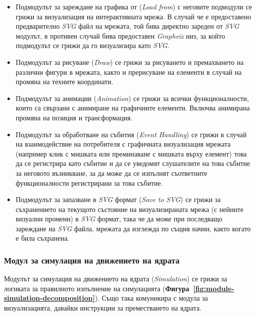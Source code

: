 \begin{itemize}
	\item Подмодулът за зареждане на графика от (\textit{Load from}) с неговите подмодули се грижи за визуализация на интерактивната мрежа. В случай че е предоставено предварително \textit{SVG} файл на мрежата, той бива директно зареден от \textit{SVG} модулът, в противен случай бива предоставен \textit{Graphviz} низ, за който подмодулът се грижи да го визуализира като \textit{SVG}.
	
	\item Подмодулът за рисуване (\textit{Draw}) се грижи за рисуването и премахването на различни фигури в мрежата, както и прерисуване на елементи в случай на промяна на техните координати.
	
	\item Подмодулът за анимации (\textit{Animation}) се грижи за всички функционалности, които са свързани с анимиране на графичните елементи. Включва анимирана промяна на позиция и трансформация.
	
	\item Подмодулът за обработване на събития (\textit{Event Handling}) се грижи в случай на взаимодействие на потребителя с графичната визуализация мрежата (например клик с мишката или преминаване с мишката върху елемент) това да се регистрира като събитие и да се уведомят слушателите на това събитие за неговото възникване, за да може да се изпълнят съответните функционалности регистрирани за това събитие.
	
	\item Подмодулът за запазване в \textit{SVG} формат (\textit{Save to SVG}) се грижи за съхранението на текущото състояние на визуализираната мрежа (с нейните визуални промени) в \textit{SVG} формат, така че да може при последващо зареждане на \textit{SVG} файла, мрежата да изглежда по същия начин, както когато е била съхранена. 
	
\end{itemize}

\subsubsection{Модул за симулация на движението на ядрата}

\hspace*{2.5em}Модулът за симулация на движението на ядрата (\textit{Simulation}) се грижи за логиката за правилното изпълнение на симулацията (\textbf{Фигура~\ref{fig:module-simulation-decomposition}}). Също така комуникира с модула за визуализацията, давайки инструкции за преместването на ядрата.

